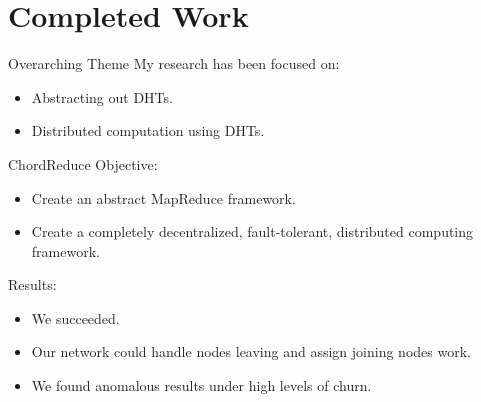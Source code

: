 \documentclass[11pt]{beamer}
\begin{document}


\section{Completed Work}

\begin{frame}{Overarching Theme}
My research has been focused on:
	\begin{itemize}
		\item Abstracting out DHTs.
		\item Distributed computation using DHTs.
	\end{itemize}
\end{frame}


\begin{frame}{ChordReduce}
Objective:
\begin{itemize}
	\item Create an abstract MapReduce framework.
	\item Create a completely decentralized, fault-tolerant, distributed computing framework. 
\end{itemize}

Results:
\begin{itemize}
	\item We succeeded.
	\item Our network could handle nodes leaving and assign joining nodes work.
	\item We found anomalous results under high levels of churn.
\end{itemize}

\end{frame}
\end{document}

